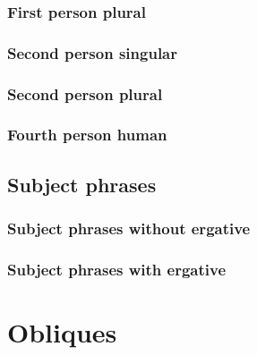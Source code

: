 \subsubsection{First person plural}\label{sec:args-subj-pron-1pl}

\subsubsection{Second person singular}\label{sec:args-subj-pron-2sg}

\subsubsection{Second person plural}\label{sec:args-subj-pron-2pl}

\subsubsection{Fourth person human}\label{sec:args-subj-pron-4h}

\subsection{Subject phrases}\label{sec:args-subj-phrase}

\subsubsection{Subject phrases without ergative}\label{sec:args-subj-phrase-noerg}

\subsubsection{Subject phrases with ergative}\label{sec:args-subj-phrase-erg}

\section{Obliques}\label{sec:args-obl}


\stopcontents[chapters]